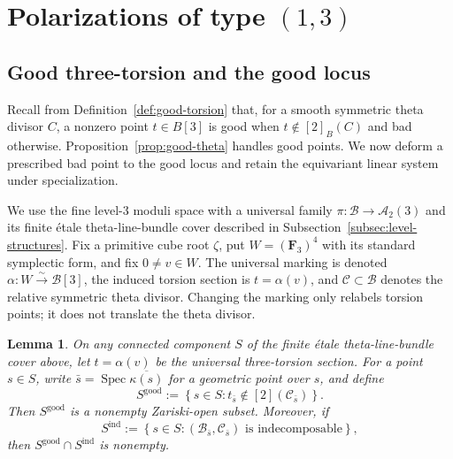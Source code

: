 \documentclass[12pt]{amsart}
\numberwithin{equation}{section}
\newtheorem{lemma}[theorem]{Lemma}
\theoremstyle{definition}
\theoremstyle{remark}
\newcommand{\Spec}{\operatorname{Spec}}
\begin{document}
\section{Polarizations of type \texorpdfstring{$(1,3)$}{(1,3)}}
\label{sec:13}

\subsection{Good three-torsion and the good locus}

Recall from Definition~\ref{def:good-torsion} that, for a smooth
symmetric theta divisor $C$, a nonzero point $t\in B[3]$ is good when
$t\notin[2]_B(C)$ and bad otherwise.  Proposition~\ref{prop:good-theta}
handles good points.  We now deform a prescribed bad point to the good
locus and retain the equivariant linear system under specialization.

We use the fine level-$3$ moduli space with a universal family $\pi: \mathscr{B}\to \mathcal{A}_2(3)$ and its finite \'etale
theta-line-bundle cover described in
Subsection~\ref{subsec:level-structures}.  Fix a primitive cube root
$\zeta$, put $W=(\mathbf F_3)^4$ with its standard symplectic form, and
fix $0\ne v\in W$.  The universal marking is denoted
$\alpha:W\xrightarrow{\sim}\mathscr B[3]$, the induced torsion section is
$t=\alpha(v)$, and $\mathscr C\subset\mathscr B$ denotes the relative
symmetric theta divisor.  Changing the marking only relabels torsion
points; it does not translate the theta divisor.

\begin{lemma}\label{lem:13-good-locus}
On any connected component $S$ of the finite \'etale
theta-line-bundle cover above, let $t=\alpha(v)$ be the universal
three-torsion section.  For a point $s\in S$, write
$\bar s=\Spec\overline{\kappa(s)}$ for a geometric point over $s$, and
define
\[
S^{\mathrm{good}}
:=
\left\{
s\in S:
t_{\bar s}\notin [2](\mathscr C_{\bar s})
\right\}.
\]
Then $S^{\mathrm{good}}$ is a nonempty Zariski-open subset.  Moreover,
if
\[
S^{\mathrm{ind}}
:=
\left\{
s\in S:
(\mathscr B_{\bar s},\mathscr C_{\bar s})
\text{ is indecomposable}
\right\},
\]
then $S^{\mathrm{good}}\cap S^{\mathrm{ind}}$ is nonempty.
\end{lemma}
\end{document}
